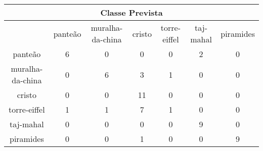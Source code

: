\begin{tabular}{|c|c|c|c|c|c|c|}
\hline
\multicolumn{7}{|c|}{Classe Prevista}\\
\hline
 & panteão & muralha-da-china & cristo & torre-eiffel & taj-mahal & piramides\\
panteão & 6 & 0 & 0 & 0 & 2 & 0\\
muralha-da-china & 0 & 6 & 3 & 1 & 0 & 0\\
cristo & 0 & 0 & 11 & 0 & 0 & 0\\
torre-eiffel & 1 & 1 & 7 & 1 & 0 & 0\\
taj-mahal & 0 & 0 & 0 & 0 & 9 & 0\\
piramides & 0 & 0 & 1 & 0 & 0 & 9\\
\hline
\end{tabular}
